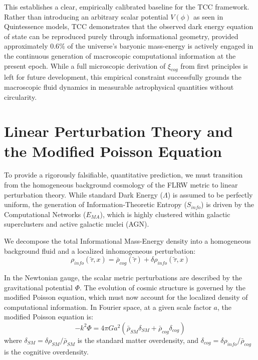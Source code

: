 \documentclass[12pt,openany]{book}
\theoremstyle{plain}
\theoremstyle{definition}
\theoremstyle{remark}
\begin{document}
This establishes a clear, empirically calibrated baseline for the TCC framework. Rather than introducing an arbitrary scalar potential $V(\phi)$ as seen in Quintessence models, TCC demonstrates that the observed dark energy equation of state can be reproduced purely through informational geometry, provided approximately $0.6\%$ of the universe's baryonic mass-energy is actively engaged in the continuous generation of macroscopic computational information at the present epoch. While a full microscopic derivation of $\xi_{cog}$ from first principles is left for future development, this empirical constraint successfully grounds the macroscopic fluid dynamics in measurable astrophysical quantities without circularity.

\section{Linear Perturbation Theory and the Modified Poisson Equation}

To provide a rigorously falsifiable, quantitative prediction, we must transition from the homogeneous background cosmology of the FLRW metric to linear perturbation theory. While standard Dark Energy ($\Lambda$) is assumed to be perfectly uniform, the generation of Information-Theoretic Entropy ($S_{info}$) is driven by the Computational Networks ($E_{MA}$), which is highly clustered within galactic superclusters and active galactic nuclei (AGN).

We decompose the total Informational Mass-Energy density into a homogeneous background fluid and a localized inhomogeneous perturbation:
\begin{equation}
\rho_{info}(\tilde{\tau}, x) = \bar{\rho}_{cog}(\tilde{\tau}) + \delta\rho_{info}(\tilde{\tau}, x)
\end{equation}

In the Newtonian gauge, the scalar metric perturbations are described by the gravitational potential $\Phi$. The evolution of cosmic structure is governed by the modified Poisson equation, which must now account for the localized density of computational information. In Fourier space, at a given scale factor $a$, the modified Poisson equation is:
\begin{equation}
-k^2 \Phi = 4\pi G a^2 \left( \bar{\rho}_{SM}\delta_{SM} + \bar{\rho}_{cog}\delta_{cog} \right)
\end{equation}
where $\delta_{SM} = \delta\rho_{SM}/\bar{\rho}_{SM}$ is the standard matter overdensity, and $\delta_{cog} = \delta\rho_{info}/\bar{\rho}_{cog}$ is the cognitive overdensity.
\end{document}
